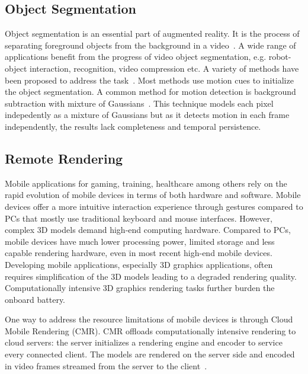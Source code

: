 \subsection{Object Segmentation}

Object segmentation is an essential part of augmented reality.
It is the process of separating foreground objects from the background in a video~\cite{papazoglou2013}. A wide range of applications benefit from the progress of video object segmentation, e.g. robot-object interaction, recognition, video compression etc.
%
A variety of methods have been proposed to address the task~\cite{papazoglou2013,ma2012,wang2015,brox2010,taylor2015}. Most methods use motion cues to initialize the object segmentation.
A common method for motion detection is  background subtraction with mixture of Gaussians~\cite{kaewtrakulpong2002,zivkovic2004}. This technique models each pixel indepedently as a mixture of Gaussians 
but as it detects motion in each frame independently, the results lack completeness and temporal persistence.

\subsection{Remote Rendering}

Mobile applications for gaming, training, healthcare among others rely on the rapid evolution of mobile devices in terms of both hardware and software.
Mobile devices offer a more intuitive interaction experience through gestures 
compared to PCs that mostly use traditional keyboard and mouse interfaces.
However, complex 3D models demand high-end computing hardware. Compared to PCs, mobile devices have much lower processing power, limited storage and less capable rendering hardware, even in most recent high-end mobile devices.
Developing mobile applications, especially 3D graphics applications, often requires simplification of the 3D models leading to a degraded rendering quality.
Computationally intensive 3D graphics rendering tasks further burden the onboard battery.

One way to address the resource limitations of mobile devices is through Cloud Mobile Rendering (CMR).
CMR offloads computationally intensive rendering to cloud servers:
the server initializes a rendering engine and encoder to service every connected client. The models are rendered on the server side and encoded in video frames streamed from the server to the client~\cite{lamberti2007,lu2011,ma2017,chang2004,simoens2012}.

